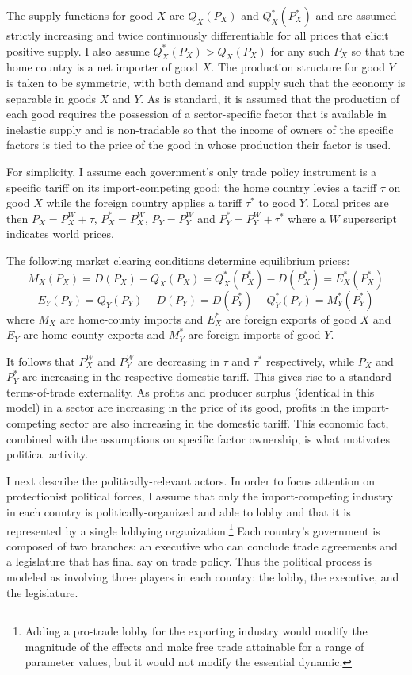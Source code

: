 \documentclass[authoryear, review]{elsarticle}
\begin{document}
The supply functions for good $X$ are $Q_X(P_X)$ and $Q_X^*(P_X^*)$ and are assumed strictly increasing and twice continuously differentiable for all prices that elicit positive supply. I also assume $Q_X^*(P_X) > Q_X(P_X)$ for any such $P_X$ so that the home country is a net importer of good $X$. The production structure for good $Y$ is taken to be symmetric, with both demand and supply such that the economy is separable in goods $X$ and $Y$. As is standard, it is assumed that the production of each good requires the possession of a sector-specific factor that is available in inelastic supply and is non-tradable so that the income of owners of the specific factors is tied to the price of the good in whose production their factor is used.

For simplicity, I assume each government's only trade policy instrument is a specific tariff on its import-competing good: the home country levies a tariff $\tau$ on good $X$ while the foreign country applies a tariff $\tau^*$ to good $Y$. Local prices are then $P_X = P_X^W + \tau$, $P_X^* = P_X^W$, $P_Y = P_Y^W$ and $P_Y^* = P_Y^W + \tau^*$ where a $W$ superscript indicates world prices.

The following market clearing conditions determine equilibrium prices:
$$M_X(P_X)= D(P_X)-Q_X(P_X) = Q_X^*(P_X^*) - D(P_X^*) = E_X^*(P_X^*)$$
$$E_Y(P_Y)=Q_Y(P_Y)-D(P_Y) = D(P_Y^*)-Q_Y^*(P_Y) = M_Y^*(P_Y^*)$$
where $M_X$ are home-county imports and $E_X^*$ are foreign exports of good $X$ and $E_Y$ are home-county exports and $M_Y^*$ are foreign imports of good $Y$.

It follows that $P_X^W$ and $P_Y^W$ are decreasing in $\tau$ and $\tau^*$ respectively, while $P_X$ and $P_Y^*$ are increasing in the respective domestic tariff. This gives rise to a standard terms-of-trade externality. As profits and producer surplus (identical in this model) in a sector are increasing in the price of its good, profits in the import-competing sector are also increasing in the domestic tariff. This economic fact, combined with the assumptions on specific factor ownership, is what motivates political activity.

I next describe the politically-relevant actors. In order to focus attention on protectionist political forces, I assume that only the import-competing industry in each country is politically-organized and able to lobby and that it is represented by a single lobbying organization.\footnote{Adding a pro-trade lobby for the exporting industry would modify the magnitude of the effects and make free trade attainable for a range of parameter values, but it would not modify the essential dynamic.} Each country's government is composed of two branches: an executive who can conclude trade agreements and a legislature that has final say on trade policy. Thus the political process is modeled as involving three players in each country: the lobby, the executive, and the legislature.
\end{document}

